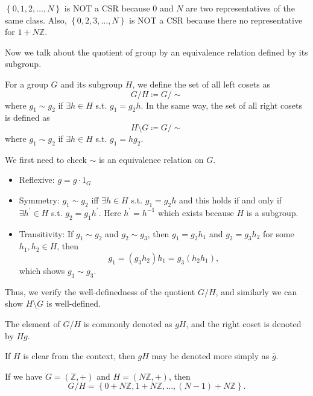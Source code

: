 \begin{eg}
    \(\left\{ 0,1,2, \dots ,N \right\} \) is NOT a CSR because \(0\) and \(N\) are two representatives of the same class. Also, \(\left\{ 0, 2,3, \dots , N \right\} \) is NOT a CSR because there no representative for \(1 + N \mathbb{Z} \).      
\end{eg}

Now we talk about the quotient of group by an equivalence relation defined by its subgroup. 

\begin{definition}
    For a group \(G\) and its subgroup \(H\), we define the set of all left cosets as 
    \[
        G / H \coloneqq  G / \sim 
    \] where \(g_1 \sim g_2\) if \(\exists h \in H\) s.t. \(g_1 = g_2 h\). In the same way, the set of all right cosets is defined as 
    \[
        H \setminus G \coloneqq G / \sim 
    \]  where \(g_1 \sim g_2\) if \(\exists h \in H\) s.t. \(g_1 = h g_2\).      
\end{definition}

We first need to check \(\sim \) is an equivalence relation on \(G\). 
\begin{itemize}
    \item Reflexive: \(g = g \cdot 1_G\) 
    \item Symmetry: \(g_1 \sim g_2\) iff \(\exists h \in H\) s.t. \(g_1 = g_2 h\) and this holds if and only if \(\exists h^{\prime} \in H\) s.t. \( g_2 = g_1 h^{\prime} \). Here \(h^{\prime} = h^{-1} \) which exists because \(H\) is a subgroup. 
    \item Transitivity: If \(g_1 \sim g_2\) and \(g_2 \sim g_3\), then \(g_1 = g_2 h_1 \) and \(g_2 = g_3 h_2\) for some \(h_1, h_2 \in H\), then 
    \[
        g_1 = (g_3 h_2)h_1 = g_3 (h_2 h_1),
    \]  which shows \(g_1 \sim g_3\).         
\end{itemize}  
Thus, we verify the well-definedness of the quotient \(G / H\), and similarly we can show \(H \setminus G\) is well-defined. 

\begin{notation}
    The element of \(G / H \) is commonly denoted as \(gH\), and the right coset is denoted by \(Hg\).    
\end{notation}

\begin{note}
    If \(H\) is clear from the context, then \(gH\) may be denoted more simply as \(\overline{g} \). 
\end{note}  

\begin{eg}
    If we have \(G = (\mathbb{Z} , +)\) and \(H = (N \mathbb{Z} , +)\), then 
    \[
        G / H = \left\{ 0 + N \mathbb{Z} , 1 + N \mathbb{Z} , \dots , (N - 1) + N \mathbb{Z}  \right\}. 
    \]
\end{eg}

